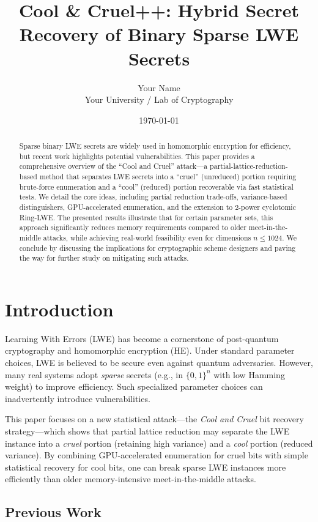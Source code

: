 \documentclass[11pt]{article}
\title{Cool \& Cruel++: Hybrid Secret Recovery of Binary Sparse LWE Secrets}
\author{Your Name \\ \small{Your University / Lab of Cryptography}}
\date{\today}
\begin{document}
\maketitle

\begin{abstract}
Sparse binary LWE secrets are widely used in homomorphic encryption for efficiency, but recent work highlights potential vulnerabilities. This paper provides a comprehensive overview of the ``Cool and Cruel'' attack---a partial-lattice-reduction-based method that separates LWE secrets into a ``cruel'' (unreduced) portion requiring brute-force enumeration and a ``cool'' (reduced) portion recoverable via fast statistical tests. We detail the core ideas, including partial reduction trade-offs, variance-based distinguishers, GPU-accelerated enumeration, and the extension to 2-power cyclotomic Ring-LWE. The presented results illustrate that for certain parameter sets, this approach significantly reduces memory requirements compared to older meet-in-the-middle attacks, while achieving real-world feasibility even for dimensions $n \leq 1024$. We conclude by discussing the implications for cryptographic scheme designers and paving the way for further study on mitigating such attacks.
\end{abstract}

\section{Introduction}
\label{sec:intro}
Learning With Errors (LWE) has become a cornerstone of post-quantum cryptography and homomorphic encryption (HE). Under standard parameter choices, LWE is believed to be secure even against quantum adversaries. However, many real systems adopt \emph{sparse} secrets (e.g., in $\{0,1\}^n$ with low Hamming weight) to improve efficiency. Such specialized parameter choices can inadvertently introduce vulnerabilities.

This paper focuses on a new statistical attack---the \emph{Cool and Cruel} bit recovery strategy---which shows that partial lattice reduction may separate the LWE instance into a \emph{cruel} portion (retaining high variance) and a \emph{cool} portion (reduced variance). By combining GPU-accelerated enumeration for cruel bits with simple statistical recovery for cool bits, one can break sparse LWE instances more efficiently than older memory-intensive meet-in-the-middle attacks.

\subsection{Previous Work}
\label{sec:previous}
\end{document}
